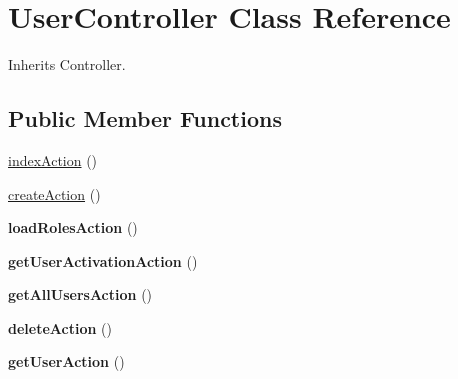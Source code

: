 \hypertarget{class_site_1_1_trail_bundle_1_1_controller_1_1_user_controller}{}\section{User\+Controller Class Reference}
\label{class_site_1_1_trail_bundle_1_1_controller_1_1_user_controller}


Inherits Controller.

\subsection*{Public Member Functions}
\begin{DoxyCompactItemize}
\item 
\hyperlink{class_site_1_1_trail_bundle_1_1_controller_1_1_user_controller_a04f2101fe1cdc785b61219c2df753024}{index\+Action} ()
\item 
\hyperlink{class_site_1_1_trail_bundle_1_1_controller_1_1_user_controller_aac49e60d30c84c3faf46fed3d0595559}{create\+Action} ()
\item 
\hypertarget{class_site_1_1_trail_bundle_1_1_controller_1_1_user_controller_a768dafcf9c2e27e87ecf88d8726db20e}{}{\bfseries load\+Roles\+Action} ()\label{class_site_1_1_trail_bundle_1_1_controller_1_1_user_controller_a768dafcf9c2e27e87ecf88d8726db20e}

\item 
\hypertarget{class_site_1_1_trail_bundle_1_1_controller_1_1_user_controller_ab031e1c17962ac8b9b50f6dc5ce9c971}{}{\bfseries get\+User\+Activation\+Action} ()\label{class_site_1_1_trail_bundle_1_1_controller_1_1_user_controller_ab031e1c17962ac8b9b50f6dc5ce9c971}

\item 
\hypertarget{class_site_1_1_trail_bundle_1_1_controller_1_1_user_controller_a31db3a392e60be657595e16e9a41ffb3}{}{\bfseries get\+All\+Users\+Action} ()\label{class_site_1_1_trail_bundle_1_1_controller_1_1_user_controller_a31db3a392e60be657595e16e9a41ffb3}

\item 
\hypertarget{class_site_1_1_trail_bundle_1_1_controller_1_1_user_controller_a183a60ff395cd1c7e16f77aca556e1f8}{}{\bfseries delete\+Action} ()\label{class_site_1_1_trail_bundle_1_1_controller_1_1_user_controller_a183a60ff395cd1c7e16f77aca556e1f8}

\item 
\hypertarget{class_site_1_1_trail_bundle_1_1_controller_1_1_user_controller_ada6a0bd2bba265967a91c2a9b9319d5f}{}{\bfseries get\+User\+Action} ()\label{class_site_1_1_trail_bundle_1_1_controller_1_1_user_controller_ada6a0bd2bba265967a91c2a9b9319d5f}


\end{DoxyCompactItemize}
